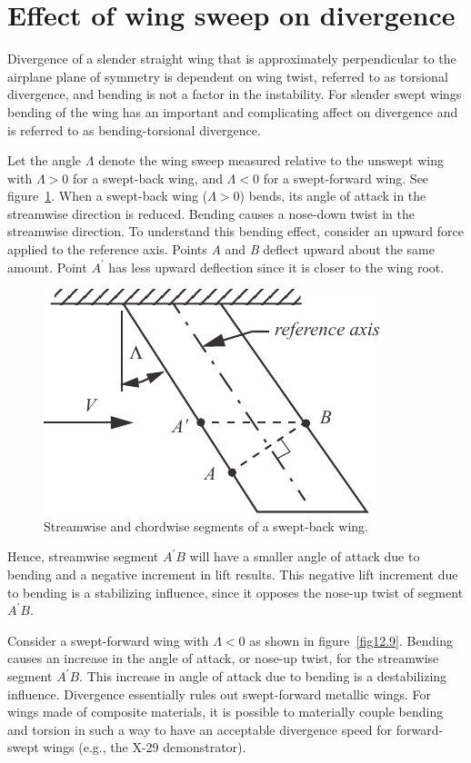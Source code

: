 \documentclass{AeroStructure-ERJohnson}
\begin{document}
\vspace*{-16pt}
\section{Effect of wing sweep on divergence}\label{sec12.4}

Divergence of a slender straight wing that is approximately perpendicular to the airplane plane of symmetry is dependent on wing twist, referred to as torsional divergence, and bending is not a factor in the instability. For slender swept wings bending of the wing has an important and complicating affect on divergence and is referred to as bending-torsional divergence.


Let the angle $\Lambda$ denote the wing sweep measured relative to the unswept wing with $\Lambda>0$ for a swept-back wing, and $\Lambda<0$ for a swept-forward wing. See figure~\ref{fig12.8}. When a swept-back wing ($\Lambda>0$) bends, its angle of attack in the streamwise direction is reduced. Bending causes a nose-down twist in the streamwise direction. To understand this bending effect, consider an upward force applied to the reference axis. Points \textit{A} and \textit{B} deflect upward about the same amount. Point $A^{\prime}$ has less upward deflection since it is closer to the wing root.\begin{figure}
\vspace{-6pt}
\includegraphics{Figure_12-8.pdf}
\caption{Streamwise and chordwise segments of a swept-back wing.\label{fig12.8}}
\end{figure} Hence, streamwise segment $A^{\prime} B$ will have a smaller angle of attack due to bending and a negative increment in lift results. This negative lift increment due to bending is a stabilizing influence, since it opposes the nose-up twist of segment $A^{\prime} B$.


Consider a swept-forward wing with $\Lambda<0$ as shown in figure~\ref{fig12.9}. Bending causes an increase in the angle of attack, or nose-up twist, for the streamwise segment $A^{\prime} B$. This increase in angle of attack due to bending is a destabilizing influence. Divergence essentially rules out swept-forward metallic wings. For wings made of composite materials, it is possible to materially couple bending and torsion in such a way to have an acceptable divergence speed for forward-swept wings (e.g., the X-29 demonstrator)\vadjust{\vspace*{8pt}\pagebreak}.
\end{document}
